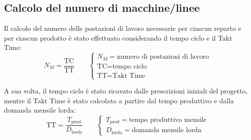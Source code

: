 \documentclass[11pt]{article}
\begin{document}
\subsection{Calcolo del numero di macchine/linee}
Il calcolo del numero delle postazioni di lavoro necessarie per ciascun reparto e per ciascun prodotto è stato effettuato considerando il tempo ciclo e il Takt Time:
\begin{equation}
    N_M = \frac{\text{TC}}{\text{TT}}
    \qquad
    \begin{cases}
        N_M = \text{numero di postazioni di lavoro} \\
        \text{TC} = \text{tempo ciclo} \\
        \text{TT} = \text{Takt Time}
    \end{cases}
\end{equation}

A sua volta, il tempo ciclo è stato ricavato dalle prescrizioni iniziali del progetto, mentre il Takt Time è stato calcolato a partire dal tempo produttivo e dalla domanda mensile lorda:
\begin{equation}
    \text{TT} = \frac{T_\text{prod}}{D_\text{lorda}}
    \qquad
    \begin{cases}
        T_\text{prod} = \text{tempo produttivo mensile} \\
        D_\text{lorda} = \text{domanda mensile lorda}
    \end{cases}
\end{equation}
\end{document}
